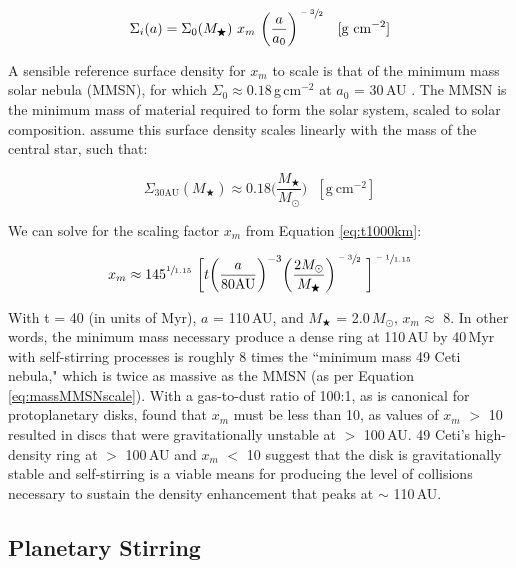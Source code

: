 \begin{equation}
\label{eq:MMSNsurf}
\Sigma_{i}(a) = \Sigma_{0}(M_{\bigstar})~x_{m}~\bigg(\frac{a}{a_{0}}\bigg)^{\sfrac{-3}{2}}~~~[\text{g}~\text{cm}^{-2}]
\end{equation}

A sensible reference surface density for $x_{m}$ to scale is that of the minimum mass solar nebula (MMSN), for which $\Sigma_{0} \approx 0.18$\,g\,cm$^{-2}$ at $a_{0}$ = 30\,AU \citep{Weid77}. The MMSN is the minimum mass of material required to form the solar system, scaled to solar composition. \citeauthor{Keny08} assume this surface density scales linearly with the mass of the central star, such that:

\begin{equation}
\label{eq:massMMSNscale}
\Sigma_{30\text{AU}}(M_{\bigstar}) \approx 0.18 \bigg(\frac{M_{\bigstar}}{M_{\odot}}\bigg)~~~[\text{g}~\text{cm}^{-2}]
\end{equation}

We can solve for the scaling factor $x_{m}$ from Equation \ref{eq:t1000km}:

\begin{equation}
x_{m} \approx 145^{\sfrac{1}{1.15}}~\bigg[t \bigg(\frac{a}{80\text{AU}}\bigg)^{-3}\bigg(\frac{2M_{\odot}}{M_{\bigstar}}\bigg)^{\sfrac{-3}{2}}~\bigg]^{\sfrac{-1}{1.15}}
\end{equation}

With t = 40 (in units of Myr), $a$ = 110\,AU, and $M_{\bigstar}$ = 2.0\,$M_{\odot}$, $x_{m} \approx$ 8. In other words, the minimum mass necessary produce a dense ring at 110\,AU by 40\,Myr with self-stirring processes is roughly 8 times the ``minimum mass 49 Ceti nebula," which is twice as massive as the MMSN (as per Equation \ref{eq:massMMSNscale}). With a gas-to-dust ratio of 100:1, as is canonical for protoplanetary disks, \cite{Must09} found that $x_{m}$ must be less than 10, as values of $x_{m}$ $>$ 10 resulted in discs that were gravitationally unstable at $>$ 100\,AU. 49 Ceti's high-density ring at $>$ 100\,AU and $x_{m}$ $<$ 10 suggest that the disk is gravitationally stable and self-stirring is a viable means for producing the level of collisions necessary to sustain the density enhancement that peaks at $\sim$ 110\,AU.  

\subsection{Planetary Stirring}
\label{PlanetStirring}

